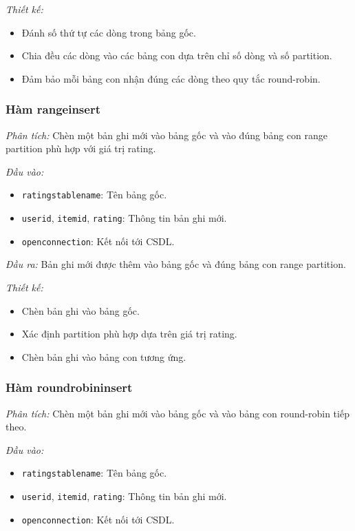 \documentclass[14pt]{extarticle}
\begin{document}
\textit{Thiết kế:}
\begin{itemize}
    \item Đánh số thứ tự các dòng trong bảng gốc.
    \item Chia đều các dòng vào các bảng con dựa trên chỉ số dòng và số partition.
    \item Đảm bảo mỗi bảng con nhận đúng các dòng theo quy tắc round-robin.
\end{itemize}

\subsubsection{Hàm rangeinsert}


\textit{Phân tích:}  
Chèn một bản ghi mới vào bảng gốc và vào đúng bảng con range partition phù hợp với giá trị rating.

\textit{Đầu vào:}
\begin{itemize}
    \item \texttt{ratingstablename}: Tên bảng gốc.
    \item \texttt{userid}, \texttt{itemid}, \texttt{rating}: Thông tin bản ghi mới.
    \item \texttt{openconnection}: Kết nối tới CSDL.
\end{itemize}

\textit{Đầu ra:}  
Bản ghi mới được thêm vào bảng gốc và đúng bảng con range partition.

\textit{Thiết kế:}
\begin{itemize}
    \item Chèn bản ghi vào bảng gốc.
    \item Xác định partition phù hợp dựa trên giá trị rating.
    \item Chèn bản ghi vào bảng con tương ứng.
\end{itemize}


\subsubsection{Hàm roundrobininsert}

\textit{Phân tích:}  
Chèn một bản ghi mới vào bảng gốc và vào bảng con round-robin tiếp theo.

\textit{Đầu vào:}
\begin{itemize}
    \item \texttt{ratingstablename}: Tên bảng gốc.
    \item \texttt{userid}, \texttt{itemid}, \texttt{rating}: Thông tin bản ghi mới.
    \item \texttt{openconnection}: Kết nối tới CSDL.
\end{itemize}
\end{document}
